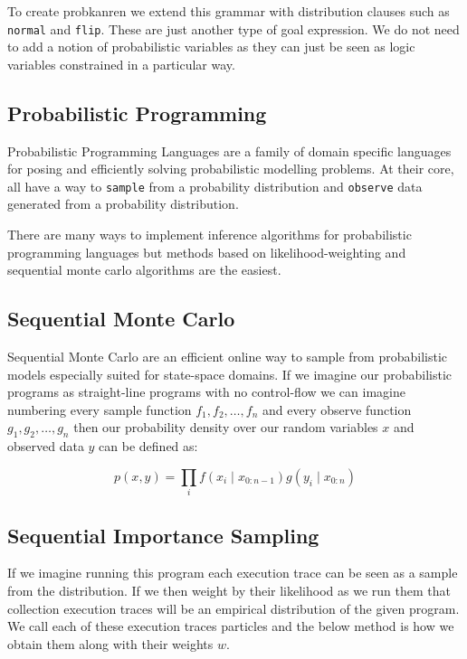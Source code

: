 \documentclass[
]{ceurart}
\begin{document}
To create probkanren we extend this grammar with distribution clauses
such as \texttt{normal} and \texttt{flip}. These are just another type
of goal expression. We do not need to add a notion of probabilistic
variables as they can just be seen as logic variables constrained in
a particular way.


\subsection{Probabilistic Programming}

Probabilistic Programming Languages\cite{wood2014new,
  van2018introduction} are a family of domain specific languages for
posing and efficiently solving probabilistic modelling problems. At
their core, all have a way to \texttt{sample} from a probability
distribution and \texttt{observe} data generated from a probability
distribution.

There are many ways to implement inference algorithms for probabilistic
programming languages but methods based on likelihood-weighting and
sequential monte carlo algorithms are the easiest.

\subsection{Sequential Monte Carlo}

Sequential Monte Carlo\cite{chopin2020introduction} are an efficient
online way to sample from probabilistic models especially suited for
state-space domains. If we imagine our probabilistic programs as
straight-line programs with no control-flow we can imagine numbering
every sample function $f_1, f_2, \ldots, f_n$ and every observe
function $g_1, g_2, \ldots, g_n$ then our probability density over our
random variables $x$ and observed data $y$ can be defined as:

\begin{equation}
  p(x, y) = \prod_i f(x_i \mid x_{0:n-1})g(y_i \mid x_{0:n})
\end{equation}

\subsection{Sequential Importance Sampling}

If we imagine running this program each execution trace can be seen as
a sample from the distribution. If we then weight by their likelihood
as we run them that collection execution traces will be an empirical
distribution of the given program. We call each of these execution traces
particles and the below method is how we obtain them along with their weights $w$.
\end{document}
